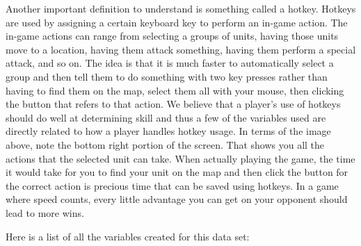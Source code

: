 \documentclass[letterpaper,10pt,english]{/usr/share/sphinx/texinputs/sphinxhowto}
\begin{document}
Another important definition to understand is something called a hotkey.
Hotkeys are used by assigning a certain keyboard key to perform an
in-game action. The in-game actions can range from selecting a groups of
units, having those units move to a location, having them attack
something, having them perform a special attack, and so on. The idea is
that it is much faster to automatically select a group and then tell
them to do something with two key presses rather than having to find
them on the map, select them all with your mouse, then clicking the
button that refers to that action. We believe that a player's use of
hotkeys should do well at determining skill and thus a few of the
variables used are directly related to how a player handles hotkey
usage. In terms of the image above, note the bottom right portion of the
screen. That shows you all the actions that the selected unit can take.
When actually playing the game, the time it would take for you to find
your unit on the map and then click the button for the correct action is
precious time that can be saved using hotkeys. In a game where speed
counts, every little advantage you can get on your opponent should lead
to more wins.

Here is a list of all the variables created for this data set:
\end{document}
